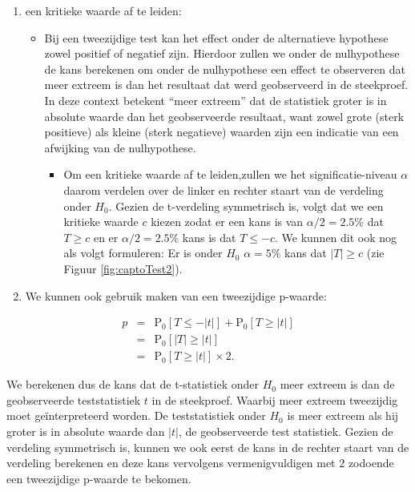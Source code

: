 \documentclass[
  12pt,dutch]{book}
\providecommand{\tightlist}{%
  \setlength{\itemsep}{0pt}\setlength{\parskip}{0pt}}
\theoremstyle{definition}
\theoremstyle{definition}
\theoremstyle{definition}
\theoremstyle{definition}
\theoremstyle{remark}
\begin{document}
\begin{enumerate}
\def\labelenumi{\arabic{enumi}.}
\tightlist
\item
  een kritieke waarde af te leiden:

  \begin{itemize}
  \tightlist
  \item
    Bij een tweezijdige test kan het effect onder de alternatieve hypothese zowel positief of negatief zijn. Hierdoor zullen we onder de nulhypothese de kans berekenen om onder de nulhypothese een effect te observeren dat meer extreem is dan het resultaat dat werd geobserveerd in de steekproef. In deze context betekent ``meer extreem'' dat de statistiek groter is in absolute waarde dan het geobserveerde resultaat, want zowel grote (sterk positieve) als kleine (sterk negatieve) waarden zijn een indicatie van een afwijking van de nulhypothese.

    \begin{itemize}
    \tightlist
    \item
      Om een kritieke waarde af te leiden,zullen we het significatie-niveau \(\alpha\) daarom verdelen over de linker en rechter staart van de verdeling onder \(H_0\). Gezien de t-verdeling symmetrisch is, volgt dat we een kritieke waarde \(c\) kiezen zodat er een kans is van \(\alpha/2=2.5\%\) dat \(T\geq c\) en er \(\alpha/2=2.5\%\) kans is dat \(T\leq -c\). We kunnen dit ook nog als volgt formuleren: Er is onder \(H_0\) \(\alpha=5\%\) kans dat \(\vert T\vert\geq c\) (zie Figuur \ref{fig:captoTest2}).
    \end{itemize}
  \end{itemize}
\item
  We kunnen ook gebruik maken van een tweezijdige p-waarde:
\end{enumerate}

\begin{eqnarray*}
  p&=&\text{P}_0\left[T\leq -|t|\right] + \text{P}_0\left[T\geq |t|\right]\\
  &=&\text{P}_0\left[\vert T\vert \geq \vert t \vert\right]\\
  &=&\text{P}_0\left[T \geq \vert t \vert\right]\times 2.
\end{eqnarray*}

We berekenen dus de kans dat de t-statistiek onder \(H_0\) meer extreem is dan de geobserveerde teststatistiek \(t\) in de steekproef.
Waarbij meer extreem tweezijdig moet geïnterpreteerd worden.
De teststatistiek onder \(H_0\) is meer extreem als hij groter is in absolute waarde dan \(\vert t  \vert\), de geobserveerde test statistiek.
Gezien de verdeling symmetrisch is, kunnen we ook eerst de kans in de rechter staart van de verdeling berekenen en deze kans vervolgens vermenigvuldigen met 2 zodoende een tweezijdige p-waarde te bekomen.
\end{document}
